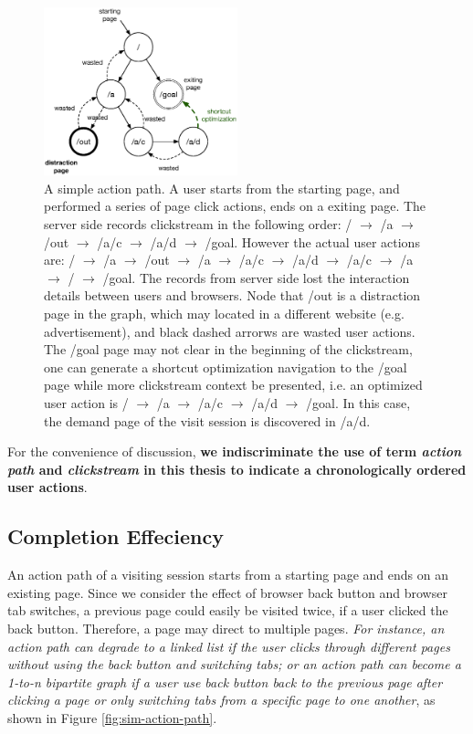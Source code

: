 \begin{figure}[H]
    \centering
    \includegraphics[width=0.5\textwidth]{figures/clickstream}
    \caption{A simple action path. A user starts from the starting page, and performed
    a series of page click actions, ends on a exiting page. 
    The server side records clickstream in the following order:
    / $\rightarrow$ /a $\rightarrow$ /out $\rightarrow$ /a/c $\rightarrow$ /a/d $\rightarrow$ /goal.
    However the actual user actions are: 
    / $\rightarrow$ /a $\rightarrow$ /out $\rightarrow$ /a $\rightarrow$ /a/c $\rightarrow$ /a/d 
    $\rightarrow$ /a/c $\rightarrow$ /a $\rightarrow$ / $\rightarrow$ /goal. 
    The records from server side lost the interaction details between users and browsers.
    Node that /out is a distraction page in the graph, 
    which may located in a different website (e.g. advertisement), 
    and black dashed arrorws are wasted user
    actions. The /goal page may not clear in the beginning of the clickstream, one can generate
    a shortcut optimization navigation to the /goal page while more clickstream context
    be presented, i.e. an optimized user action is 
    / $\rightarrow$ /a $\rightarrow$ /a/c $\rightarrow$ /a/d $\rightarrow$ /goal. In this case,
    the demand page of the visit session is discovered in /a/d.}
    \label{fig:clickstream}
\end{figure}

For the convenience of discussion, \textbf{we indiscriminate the use of 
term \emph{action path} and \emph{clickstream} in
this thesis to indicate a chronologically ordered user actions}.

\subsection{Completion Effeciency}

An action path of a visiting session starts from a starting page and ends on an existing page.
Since we consider the effect of browser back button and browser tab switches, 
a previous page could easily be visited twice, if a user clicked the back button. 
Therefore, a page may direct to multiple pages. \emph{For instance, 
an action path can degrade to a linked list if the user clicks through different pages 
without using the back button and switching tabs; or an action path can become 
a 1-to-n bipartite graph if a user use back button back to the previous page after 
clicking a page or only switching tabs from a specific page to one another}, 
as shown in Figure \ref{fig:sim-action-path}.

